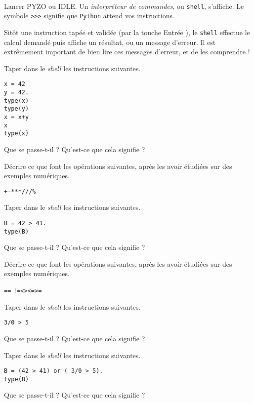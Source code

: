\setcounter{numques}{0}~\\


Lancer PYZO ou IDLE. Un \emph{interpréteur de commandes}, ou \texttt{shell}, s'affiche. 
Le symbole \texttt{>}\texttt{>}\texttt{>} signifie que \texttt{Python}{} attend vos instructions. 

Sitôt une instruction tapée et validée (par la touche \og Entrée \fg{}), le \texttt{shell} effectue le calcul demandé puis affiche un résultat, ou un message d'erreur. 
Il est extrêmement important de bien lire ces messages d'erreur, et de les comprendre ! 

\medskip{}

\question{} Taper dans le \emph{shell} les instructions suivantes. 
\begin{lstlisting}
x = 42
y = 42.
type(x)
type(y)
x = x+y
x
type(x)
\end{lstlisting}
Que se passe-t-il ? Qu'est-ce que cela signifie ?

\medskip{}

\question{} Décrire ce que font les opérations suivantes, après les avoir étudiées sur des exemples numériques.
\begin{center}
  \texttt{+}\qquad \texttt{-}\qquad \texttt{*}\qquad \texttt{**}\qquad \texttt{/}\qquad \texttt{//}\qquad \texttt{\%}
\end{center}


\question{} Taper dans le \emph{shell} les instructions suivantes. 
\begin{lstlisting}
B = 42 > 41.
type(B)
\end{lstlisting}
Que se passe-t-il ? Qu'est-ce que cela signifie ?

\medskip{}

\question{} Décrire ce que font les opérations suivantes, après les avoir étudiées sur des exemples numériques.
\begin{center}
  \texttt{==} {} \qquad{} \texttt{!=}\qquad\texttt{<}\qquad\texttt{>}\qquad\texttt{<=}\qquad\texttt{>=}
\end{center}

\medskip{}

\question{} Taper dans le \emph{shell} les instructions suivantes. 
\begin{lstlisting}
3/0 > 5
\end{lstlisting}
Que se passe-t-il ? Qu'est-ce que cela signifie ?
\medskip{}

\question{} Taper dans le \emph{shell} les instructions suivantes. 
\begin{lstlisting}
B = (42 > 41) or ( 3/0 > 5).
type(B)
\end{lstlisting}
Que se passe-t-il ? Qu'est-ce que cela signifie ?

